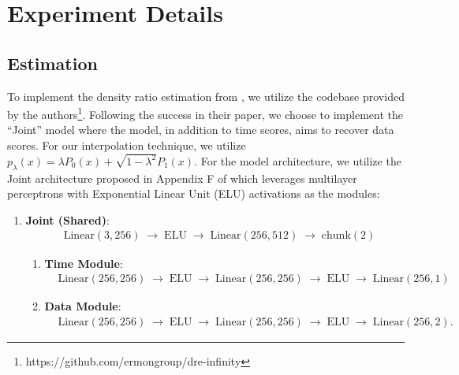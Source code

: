 \documentclass[11pt,letterpaper]{article}
\begin{document}
\section{Experiment Details} \label{sec:exp_det}

\subsection{Estimation} \label{ssec:estexpdet}



To implement the density ratio estimation from \citet{choi2022density}, we utilize the codebase provided by the authors\footnote{https://github.com/ermongroup/dre-infinity}. Following the success in their paper, we choose to implement the ``Joint'' model where the model, in addition to time scores, aims to recover data scores. For our interpolation technique, we utilize $p_\lambda(x) = \lambda P_0(x) + \sqrt{1 - \lambda^2} P_1(x)$. For the model architecture, we utilize the Joint architecture proposed in Appendix F of \citet{choi2022density} which leverages multilayer perceptrons with Exponential Linear Unit (ELU) activations as the modules: 

\begin{enumerate}[label=\arabic*.]
  \item \textbf{Joint (Shared)}:
    \begin{align*}
      &\mathrm{Linear}(3,256)
      \;\to\;\mathrm{ELU}
      \;\to\;\mathrm{Linear}(256,512)
      \;\to\;\mathrm{chunk}(2)
    \end{align*}
    \begin{enumerate}[label=(\alph*)]
      \item \textbf{Time Module}:
        \begin{align*}
          &\mathrm{Linear}(256,256)
          \;\to\;\mathrm{ELU}
          \;\to\;\mathrm{Linear}(256,256)
          \;\to\;\mathrm{ELU}
          \;\to\;\mathrm{Linear}(256,1)
        \end{align*}
      \item \textbf{Data Module}:
        \begin{align*}
          &\mathrm{Linear}(256,256)
          \;\to\;\mathrm{ELU}
          \;\to\;\mathrm{Linear}(256,256)
          \;\to\;\mathrm{ELU}
          \;\to\;\mathrm{Linear}(256,2).
        \end{align*}
    \end{enumerate}
\end{enumerate}
\end{document}
